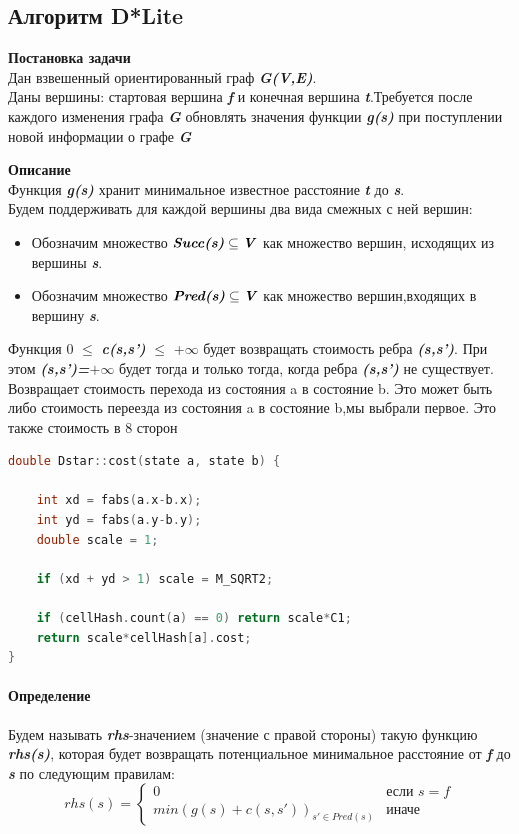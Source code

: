\documentclass[12pt]{article}
\begin{document}
\subsection*{Алгоритм D*Lite}
\textbf{Постановка задачи}\\
Дан взвешенный ориентированный граф \textbf{\emph{G(V,E)}}.\\
Даны вершины: стартовая вершина \textbf{\emph{f}} и конечная вершина \textbf{\emph{t}}.Требуется после каждого изменения графа \textbf{\emph{G}} обновлять значения функции \textbf{\emph{g(s)}} при поступлении новой информации о графе  \textbf{\emph{G}}

\textbf{Описание}\\
Функция \textbf{\emph{g(s)}} хранит минимальное известное расстояние \textbf{\emph{t}} до \textbf{\emph{s}}.\\ 
Будем поддерживать для каждой вершины два вида смежных с ней вершин:
\begin{itemize}
  \item Обозначим множество $\textbf{\emph{Succ(s)}} \subseteq \textbf{\emph{V}}$ как множество вершин, исходящих из вершины \textbf{\emph{s}}.
  \item Обозначим множество $\textbf{\emph{Pred(s)}} \subseteq \textbf{\emph{V}}$ как множество вершин,входящих в вершину \textbf{\emph{s}}.
\end{itemize}


Функция  0 $\leq$ \textbf{\emph{c(s,s') }} $\leq$ +$\infty$ будет возвращать стоимость ребра \textbf{\emph{(s,s')}}. При этом \textbf{\emph{(s,s')=}}$+\infty$ будет тогда и только тогда, когда ребра \textbf{\emph{(s,s')}} не существует.\\
Возвращает стоимость перехода из состояния a в состояние b. Это может быть либо стоимость переезда из состояния a  в состояние b,мы выбрали первое.
Это также стоимость в 8 сторон
\begin{lstlisting}[language=C,style=C]
double Dstar::cost(state a, state b) {

    int xd = fabs(a.x-b.x);
    int yd = fabs(a.y-b.y);
    double scale = 1;

    if (xd + yd > 1) scale = M_SQRT2;

    if (cellHash.count(a) == 0) return scale*C1;
    return scale*cellHash[a].cost;
}
\end{lstlisting}


\paragraph{Определение}
Будем называть \textbf{\emph{rhs}}-значением (значение с правой стороны) такую функцию \textbf{\emph{rhs(s)}}, которая будет возвращать потенциальное минимальное расстояние от \textbf{\emph{f}} до \textbf{\emph{s}} по следующим правилам:
\begin{displaymath}
rhs(s) = \left\{ \begin{array}{ll}
 0 & \textrm{если $s=f$}\\
 min(g(s)+c(s,s'))_{s'\in Pred(s)} & \textrm{иначе}
  \end{array} \right.
\end{displaymath}
\end{document}
